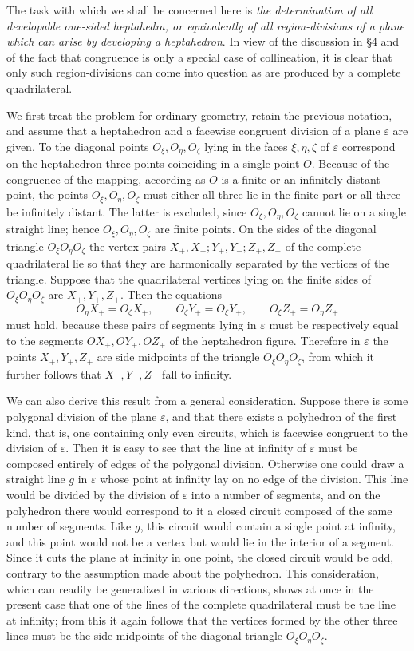 \documentclass[11pt,a4paper]{article}
\begin{document}
The task with which we shall be concerned here is \emph{the determination of all developable one-sided heptahedra, or equivalently of all region-divisions of a plane which can arise by developing a heptahedron}. In view of the discussion in \S 4 and of the fact that congruence is only a special case of collineation, it is clear that only such region-divisions can come into question as are produced by a complete quadrilateral.

We first treat the problem for ordinary geometry, retain the previous notation, and assume that a heptahedron and a facewise congruent division of a plane $\varepsilon$ are given. To the diagonal points $O_\xi,O_\eta,O_\zeta$ lying in the faces $\xi,\eta,\zeta$ of $\varepsilon$ correspond on the heptahedron three points coinciding in a single point $O$. Because of the congruence of the mapping, according as $O$ is a finite or an infinitely distant point, the points $O_\xi,O_\eta,O_\zeta$ must either all three lie in the finite part or all three be infinitely distant. The latter is excluded, since $O_\xi,O_\eta,O_\zeta$ cannot lie on a single straight line; hence $O_\xi,O_\eta,O_\zeta$ are finite points. On the sides of the diagonal triangle $O_\xi O_\eta O_\zeta$ the vertex pairs $X_+,X_-;Y_+,Y_-;Z_+,Z_-$ of the complete quadrilateral lie so that they are harmonically separated by the vertices of the triangle. Suppose that the quadrilateral vertices lying on the finite sides of $O_\xi O_\eta O_\zeta$ are $X_+,Y_+,Z_+$. Then the equations
\[
 O_\eta X_+=O_\zeta X_+,
 \qquad O_\zeta Y_+=O_\xi Y_+,
 \qquad O_\xi Z_+=O_\eta Z_+
\]
must hold, because these pairs of segments lying in $\varepsilon$ must be respectively equal to the segments $OX_+,OY_+,OZ_+$ of the heptahedron figure. Therefore in $\varepsilon$ the points $X_+,Y_+,Z_+$ are side midpoints of the triangle $O_\xi O_\eta O_\zeta$, from which it further follows that $X_-,Y_-,Z_-$ fall to infinity.

We can also derive this result from a general consideration. Suppose there is some polygonal division of the plane $\varepsilon$, and that there exists a polyhedron of the first kind, that is, one containing only even circuits, which is facewise congruent to the division of $\varepsilon$. Then it is easy to see that the line at infinity of $\varepsilon$ must be composed entirely of edges of the polygonal division. Otherwise one could draw a straight line $g$ in $\varepsilon$ whose point at infinity lay on no edge of the division. This line would be divided by the division of $\varepsilon$ into a number of segments, and on the polyhedron there would correspond to it a closed circuit composed of the same number of segments. Like $g$, this circuit would contain a single point at infinity, and this point would not be a vertex but would lie in the interior of a segment. Since it cuts the plane at infinity in one point, the closed circuit would be odd, contrary to the assumption made about the polyhedron. This consideration, which can readily be generalized in various directions, shows at once in the present case that one of the lines of the complete quadrilateral must be the line at infinity; from this it again follows that the vertices formed by the other three lines must be the side midpoints of the diagonal triangle $O_\xi O_\eta O_\zeta$.
\end{document}
